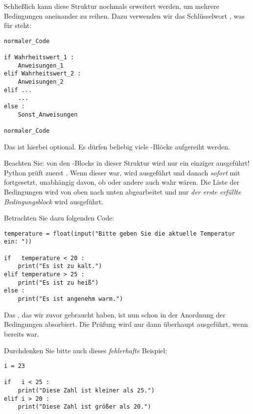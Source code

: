 Schließlich kann diese Struktur nochmals erweitert werden, um mehrere Bedingungen aneinander zu reihen. Dazu verwenden wir das Schlüsselwort , was für  steht:

\begin{codebox}
\begin{verbatim}
normaler_Code

if Wahrheitswert_1 :
    Anweisungen_1
elif Wahrheitswert_2 :
    Anweisungen_2
elif ...
    ...
else :
    Sonst_Anweisungen
	
normaler_Code
\end{verbatim}
\end{codebox}

Das  ist hierbei optional. Es dürfen beliebig viele -Blöcke aufgereiht werden.

Beachten Sie: von den -Blocks in dieser Struktur wird nur ein einziger ausgeführt! Python prüft zuerst . Wenn dieser  war, wird  ausgeführt und danach \emph{sofort} mit  fortgesetzt, unabhängig davon, ob  oder andere auch wahr wären. Die Liste der Bedingungen wird von oben nach unten abgearbeitet und nur \emph{der erste erfüllte Bedingungsblock} wird ausgeführt.

Betrachten Sie dazu folgenden Code:
\begin{codebox}
\begin{verbatim}
temperature = float(input("Bitte geben Sie die aktuelle Temperatur ein: "))

if   temperature < 20 :
    print("Es ist zu kalt.")
elif temperature > 25 :
    print("Es ist zu heiß")
else :
    print("Es ist angenehm warm.")
\end{verbatim}
\end{codebox}

Das , das wir zuvor gebraucht haben, ist nun schon in der Anordnung der Bedingungen absorbiert. Die Prüfung  wird nur dann überhaupt ausgeführt, wenn  bereits  war.

Durchdenken Sie bitte auch dieses \emph{fehlerhafte} Beispiel:
\begin{warnbox}[Fehlerhafter Code: \texttt{elif}, leftupper=7mm]
\begin{verbatim}
i = 23

if   i < 25 :
    print("Diese Zahl ist kleiner als 25.")
elif i > 20 :
    print("Diese Zahl ist größer als 20.")
\end{verbatim}
\end{warnbox}

